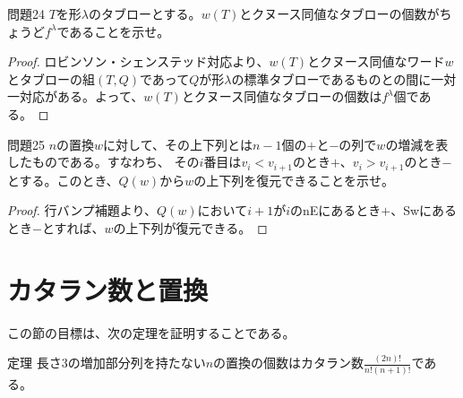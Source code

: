\documentclass[a4paper,11pt]{jsarticle}
\theoremstyle{plain}
\theoremstyle{definition}
\renewcommand{\(}{\left(}
\renewcommand{\)}{\right)}
\renewcommand{\[}{\left[}
\renewcommand{\]}{\right]}
\renewcommand{\{}{\left\lbrace}
\renewcommand{\}}{\right\rbrace}
\begin{document}
\begin{itembox}[l]{問題24}
    $T$を形$\lambda$のタブローとする。$w(T)$とクヌース同値なタブローの個数がちょうど$f^{\lambda}$であることを示せ。
\end{itembox}

\begin{proof}
    ロビンソン・シェンステッド対応より、$w(T)$とクヌース同値なワード$w$とタブローの組$(T,Q)$であって$Q$が形$\lambda$の標準タブローであるものとの間に一対一対応がある。よって、$w(T)$とクヌース同値なタブローの個数は$f^{\lambda}$個である。
\end{proof}

\begin{itembox}[l]{問題25}
    $n$の置換$w$に対して、その上下列とは$n-1$個の$+$と$-$の列で$w$の増減を表したものである。すなわち、
    その$i$番目は$v_i < v_{i+1}$のとき$+$、$v_i > v_{i+1}$のとき$-$とする。このとき、$Q(w)$から$w$の上下列を復元できることを示せ。
\end{itembox}

\begin{proof}
    行バンプ補題より、$Q(w)$において$i+1$が$i$のnEにあるとき$+$、Swにあるとき$-$とすれば、$w$の上下列が復元できる。
\end{proof}

\newpage
\section{カタラン数と置換}

この節の目標は、次の定理を証明することである。

\begin{itembox}[l]{定理}
    長さ$3$の増加部分列を持たない$n$の置換の個数はカタラン数$\displaystyle \frac{(2n)!}{n!(n+1)!}$である。
\end{itembox}
\end{document}
